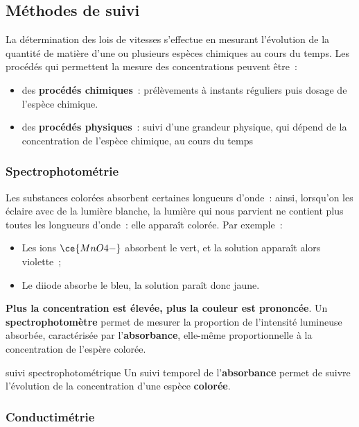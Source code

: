 \documentclass[../main/main.tex]{subfiles}
\begin{document}
\subsection{Méthodes de suivi}

La détermination des lois de vitesses s'effectue en mesurant l'évolution de la
quantité de matière d'une ou plusieurs espèces chimiques au cours du temps. Les
procédés qui permettent la mesure des concentrations peuvent être~:

\begin{itemize}
    \item des \textbf{procédés chimiques}~: prélèvements à instants réguliers
        puis dosage de l'espèce chimique.
    \item des \textbf{procédés physiques}~: suivi d'une grandeur physique, qui
        dépend de la concentration de l'espèce chimique, au cours du temps
\end{itemize}

\subsubsection{Spectrophotométrie}
Les substances colorées absorbent certaines longueurs d'onde~: ainsi, lorsqu'on
les éclaire avec de la lumière blanche, la lumière qui nous parvient ne contient
plus toutes les longueurs d'onde~: elle apparaît colorée. Par exemple~:
\begin{itemize}
    \item Les ions $\ce{MnO4-}$ absorbent le vert, et la solution apparaît alors
        violette~;
    \item Le diiode absorbe le bleu, la solution paraît donc jaune.
\end{itemize}

\textbf{Plus la concentration est élevée, plus la couleur est prononcée}. Un
\textbf{spectrophotomètre} permet de mesurer la proportion de l'intensité
lumineuse absorbée, caractérisée par l'\textbf{absorbance}, elle-même
proportionnelle à la concentration de l'espère colorée.

\begin{prop}[label=prop:spectro, halign=center]{suivi spectrophotométrique}
    Un suivi temporel de l'\textbf{absorbance} permet de suivre l'évolution de
    la concentration d'une espèce \textbf{colorée}.
\end{prop}

\subsubsection{Conductimétrie}
\end{document}
